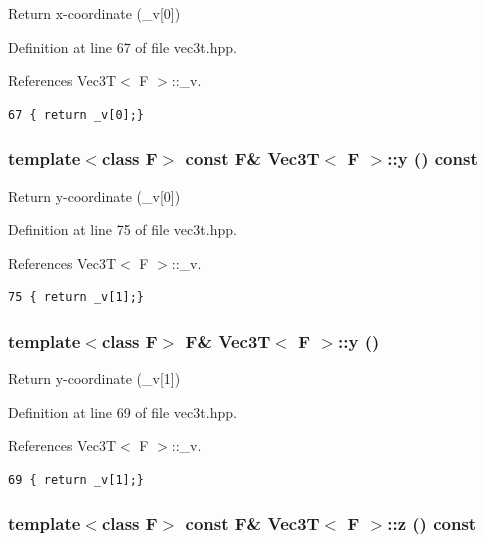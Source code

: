 Return x-coordinate (\_\-v[0]) 

Definition at line 67 of file vec3t.hpp.

References Vec3T$<$ F $>$::\_\-v.

\footnotesize\begin{verbatim}67 { return _v[0];}
\end{verbatim}\normalsize 


\subsubsection{\setlength{\rightskip}{0pt plus 5cm}template$<$class F$>$ const F\& {\bf Vec3T}$<$ F $>$::y () const\hspace{0.3cm}{\tt  [inline]}}\label{classVec3T_0aa081a05397b4edd9d072a1d05f25c3_0aa081a05397b4edd9d072a1d05f25c3}


Return y-coordinate (\_\-v[0]) 

Definition at line 75 of file vec3t.hpp.

References Vec3T$<$ F $>$::\_\-v.

\footnotesize\begin{verbatim}75 { return _v[1];}
\end{verbatim}\normalsize 


\subsubsection{\setlength{\rightskip}{0pt plus 5cm}template$<$class F$>$ F\& {\bf Vec3T}$<$ F $>$::y ()\hspace{0.3cm}{\tt  [inline]}}\label{classVec3T_1dd5a44efca58e87cf45e4453a1f7a02_1dd5a44efca58e87cf45e4453a1f7a02}


Return y-coordinate (\_\-v[1]) 

Definition at line 69 of file vec3t.hpp.

References Vec3T$<$ F $>$::\_\-v.

\footnotesize\begin{verbatim}69 { return _v[1];}
\end{verbatim}\normalsize 


\subsubsection{\setlength{\rightskip}{0pt plus 5cm}template$<$class F$>$ const F\& {\bf Vec3T}$<$ F $>$::z () const\hspace{0.3cm}{\tt  [inline]}}\label{classVec3T_e4cf632abf5500a084c87337981fb69a_e4cf632abf5500a084c87337981fb69a}


